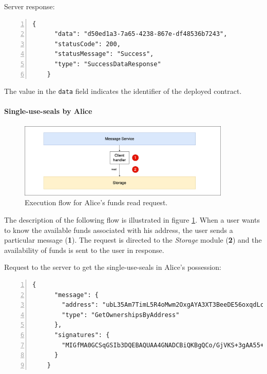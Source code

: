 Server response:
{
  \small
  \begin{Verbatim}[numbers=left,xleftmargin=1cm,firstnumber=1,breaklines=true,breakanywhere=true,tabsize=2]
    {
      "data": "d50ed1a3-7a65-4238-867e-df48536b7243",
      "statusCode": 200,
      "statusMessage": "Success",
      "type": "SuccessDataResponse"
    }
  \end{Verbatim}
}

The value in the \verb|data| field indicates the identifier of the deployed contract.

\paragraph{Single-use-seals by Alice}

{
  \small
  \begin{figure}[htbp]
    \begin{center}
      \includegraphics[width=0.9\textwidth]{immagini/capitolo-5/get-funds-flow.png}
      \caption{Execution flow for Alice's funds read request.}
      \label{fig:get-funds-flow}
    \end{center}
  \end{figure}
}

The description of the following flow is illustrated in figure \ref{fig:get-funds-flow}. When a user wants 
to know the available funds associated with his address, the user sends a particular message (\textbf{1}). 
The request is directed to the \textit{Storage} module (\textbf{2}) and the availability of funds is sent 
to the user in response.

Request to the server to get the single-use-seals in Alice's possession:
{
  \small
  \begin{Verbatim}[numbers=left,xleftmargin=1cm,firstnumber=1,breaklines=true,breakanywhere=true,tabsize=2]
    {
      "message": {
        "address": "ubL35Am7TimL5R4oMwm2OxgAYA3XT3BeeDE56oxqdLc=",
        "type": "GetOwnershipsByAddress"
      },
      "signatures": {
        "MIGfMA0GCSqGSIb3DQEBAQUAA4GNADCBiQKBgQCo/GjVKS+3gAA55+kko41yINdOcCLQMSBQyuTTkKHE1mhu/TgOpivM0wLPsSga8hQMr3+v3aR0IF/vfCRf6SdiXmWx/jflmEXtnT6fkGcnV6dGNUpHWXSpwUIDt0N88jfnEqekx4S+KDCKg99sGEeHeT65fKS8lB0gjHMt9AOriwIDAQAB": "MomZTc63z7PfH35c1dL4tjXebcsW+0Zxl0nP1NQdcUFws98DX+bMWI7L0C6IO5lxvkYve4zdio1Crn97FXvngK4aVfiEZEnHOJ0tstq7uQYGErM3DDAABqPq8HH5yoKnLST2LWpO0oD8G/VXvIE6qMT5D34W1Ci0q4uh+7y3EcY="
      }
    }
  \end{Verbatim}
}

